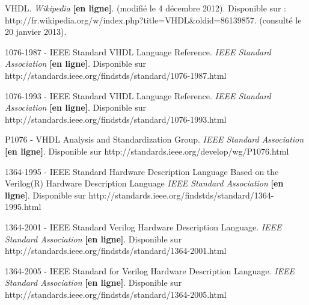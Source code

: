VHDL. \textit{Wikipedia} \textbf{[en ligne]}. (modifié le 4 décembre 2012). Disponible sur : http://fr.wikipedia.org/w/index.php?title=VHDL&oldid=86139857. (consulté le 20 janvier 2013).

1076-1987 - IEEE Standard VHDL Language Reference. \textit{IEEE Standard Association} \textbf{[en ligne]}. Disponible sur http://standards.ieee.org/findstds/standard/1076-1987.html
	
1076-1993 - IEEE Standard VHDL Language Reference. \textit{IEEE Standard Association} \textbf{[en ligne]}. Disponible sur http://standards.ieee.org/findstds/standard/1076-1993.html

P1076 - VHDL Analysis and Standardization Group. \textit{IEEE Standard Association} \textbf{[en ligne]}. Disponible sur http://standards.ieee.org/develop/wg/P1076.html

1364-1995 - IEEE Standard Hardware Description Language Based on the Verilog(R) Hardware Description Language \textit{IEEE Standard Association} \textbf{[en ligne]}. Disponible sur http://standards.ieee.org/findstds/standard/1364-1995.html
	
1364-2001 - IEEE Standard Verilog Hardware Description Language. \textit{IEEE Standard Association} \textbf{[en ligne]}. Disponible sur http://standards.ieee.org/findstds/standard/1364-2001.html

1364-2005 - IEEE Standard for Verilog Hardware Description Language. \textit{IEEE Standard Association} \textbf{[en ligne]}. Disponible sur http://standards.ieee.org/findstds/standard/1364-2005.html

